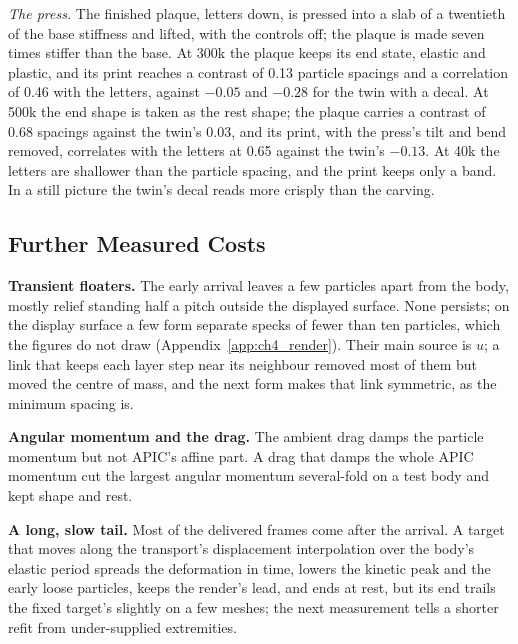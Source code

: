 \textit{The press.} The finished plaque, letters down, is pressed into a slab of a twentieth of the base stiffness and lifted,
with the controls off; the plaque is made seven times stiffer than the base. At 300k the plaque keeps its end state, elastic
and plastic, and its print reaches a contrast of 0.13 particle spacings and a correlation of 0.46 with the letters, against
$-0.05$ and $-0.28$ for the twin with a decal. At 500k the end shape is taken as the rest shape; the plaque carries a
contrast of 0.68 spacings against the twin's 0.03, and its print, with the press's tilt and bend removed, correlates with
the letters at 0.65 against the twin's $-0.13$. At 40k the letters are shallower than the particle spacing, and the print
keeps only a band. In a still picture the twin's decal reads more crisply than the carving.


\subsection{Further Measured Costs}
\label{app:ch4_costs}
\textbf{Transient floaters.} The early arrival leaves a few particles apart from the body, mostly relief standing half a
pitch outside the displayed surface. None persists; on the display surface a few form separate specks of fewer than ten
particles, which the figures do not draw (Appendix~\ref{app:ch4_render}). Their main
source is $u$; a link that keeps each layer step near its neighbour removed most of them but moved the centre of mass, and
the next form makes that link symmetric, as the minimum spacing is.

\textbf{Angular momentum and the drag.} The ambient drag damps the particle momentum but not APIC's affine part. A drag that
damps the whole APIC momentum cut the largest angular momentum several-fold on a test body and kept shape and rest.

\textbf{A long, slow tail.} Most of the delivered frames come after the arrival. A target that moves along the transport's
displacement interpolation over the body's elastic period spreads the deformation in time, lowers the kinetic peak and the
early loose particles, keeps the render's lead, and ends at rest, but its end trails the fixed target's slightly on a few
meshes; the next measurement tells a shorter refit from under-supplied extremities.

\setlength{\emergencystretch}{1.5em}

